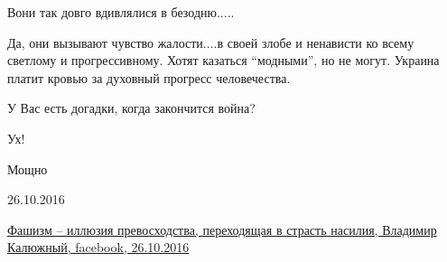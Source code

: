 \begin{itemize}
Вони так довго вдивлялися в безодню.....


Да, они вызывают чувство жалости....в своей злобе и ненависти ко всему светлому
и прогрессивному. Хотят казаться \enquote{модными}, но не могут. Украина платит кровью
за духовный прогресс человечества.

У Вас есть догадки, когда закончится война?

Ух!

Мощно


26.10.2016

\href{https://www.facebook.com/Vladimir.Kalyuzhniy/posts/943868742385201}{%
Фашизм – иллюзия превосходства, переходящая в страсть насилия, Владимир Калюжный, facebook, 26.10.2016
}

\end{itemize} %
